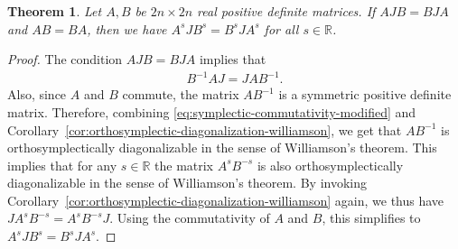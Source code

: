 \documentclass[10pt,a4paper]{amsart}
\newtheorem{theorem}{Theorem}
\begin{document}
    \begin{theorem}\label{thm:symplectic-commute-powers}
        Let $A, B$ be $2n \times 2n$ real positive definite matrices.
        If $AJB=BJA$ and $AB=BA$, then we have $A^s J B^s= B^s J A^s$ for all $s \in \mathds{R}$.
    \end{theorem}

    \begin{proof}
        The condition $AJB=BJA$ implies that
        \begin{align}\label{eq:symplectic-commutativity-modified}
            B^{-1}AJ=JAB^{-1}.
        \end{align}
        Also, since $A$ and $B$ commute, the matrix $AB^{-1}$ is a symmetric positive definite matrix. 
        Therefore, combining \eqref{eq:symplectic-commutativity-modified} and Corollary~\ref{cor:orthosymplectic-diagonalization-williamson}, we get that $AB^{-1}$ is orthosymplectically diagonalizable in the sense of Williamson's theorem.
        This implies that for any $s \in \mathds{R}$ the matrix $A^sB^{-s}$ is also orthosymplectically diagonalizable in the sense of Williamson's theorem.
        By invoking Corollary~\ref{cor:orthosymplectic-diagonalization-williamson} again, we thus have $JA^sB^{-s}=A^sB^{-s}J$.
        Using the commutativity of $A$ and $B$, this simplifies to $A^s J B^s = B^s J A^s$.
    \end{proof}
\end{document}
